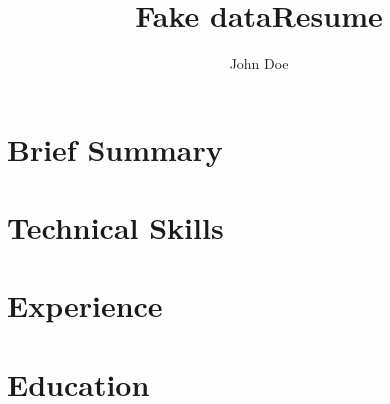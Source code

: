 \documentclass[10pt,a4paper]{article}
\title{Fake data}
\author{John Doe}
\begin{document}
\title{Resume}


\part{Brief Summary}


\part{Technical Skills}


\part{Experience}


\part{Education}

\end{document}
